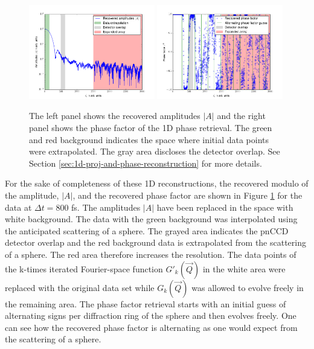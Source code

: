 \begin{figure}
	\centering
		\includegraphics[width=0.49\textwidth]{images/results/amplitude-discussion.png}
		\includegraphics[width=0.49\textwidth]{images/results/phase-discussion.png}
	\caption[Recovered Amplitudes $\left|A\right|$ and phase factor of 1D reconstruction]{The left panel shows the recovered amplitudes $\left|A\right|$ and the right panel shows the phase factor of the 1D phase retrieval. The green and red background indicates the space where initial data points were extrapolated. The gray area discloses the detector overlap. See Section \ref{sec:1d-proj-and-phase-reconstruction} for more details.}
	\label{fig:amplitude-phase}
\end{figure}
For the sake of completeness of these 1D reconstructions, the recovered modulo of the amplitude, $\left|A\right|$, and the recovered phase factor are shown in Figure \ref{fig:amplitude-phase} for the data at $\Delta t =800$ fs. The amplitudes $\left|A\right|$ have been replaced in the space with white background. The data with the green background was interpolated using the anticipated scattering of a sphere. The grayed area indicates the pnCCD detector overlap and the red background data is extrapolated from the scattering of a sphere. The red area therefore increases the resolution. The data points of the k-times iterated Fourier-space function $G'_{k}(\vec{Q})$ in the white area were replaced with the original data set while $G_{k}(\vec{Q})$ was allowed to evolve freely in the remaining area. The phase factor retrieval starts with an initial guess of alternating signs per diffraction ring of the sphere and then evolves freely. One can see how the recovered phase factor is alternating as one would expect from the scattering of a sphere.\\[1\baselineskip]
